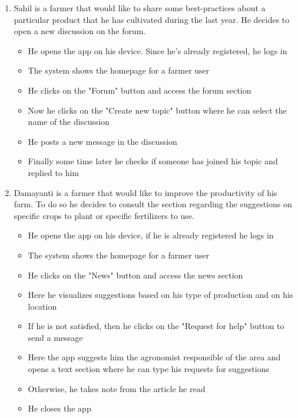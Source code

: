 \documentclass[table, 12pt]{article}
\begin{document}
\begin{enumerate}
    \item Sahil is a farmer that would like to share some best-practices about a particular product that he has cultivated during the last year.
    He decides to open a new discussion on the forum.
    \begin{itemize}
        \item He opens the app on his device. Since he's already registered, he logs in
        \item The system shows the homepage for a farmer user
        \item He clicks on the "Forum" button and access the forum section
        \item Now he clicks on the "Create new topic" button where he can select the name of the discussion
        \item He posts a new message in the discussion
        \item Finally some time later he checks if someone has joined his topic and replied to him
    \end{itemize}

    \item Damayanti is a farmer that would like to improve the productivity of his farm.
    To do so he decides to consult the section regarding the suggestions on specific crops to plant or specific fertilizers to use.
    \begin{itemize}
        \item He opens the app on his device, if he is already registered he logs in
        \item The system shows the homepage for a farmer user
        \item He clicks on the "News" button and access the news section
        \item Here he visualizes suggestions based on his type of production and on his location
        \item If he is not satisfied, then he clicks on the "Request for help" button to send a message
        \item Here the app suggests him the agronomist responsible of the area and opens a text section where he can type his requests for suggestions
        \item Otherwise, he takes note from the article he read
        \item He closes the app
    \end{itemize}


\end{enumerate}
\end{document}
